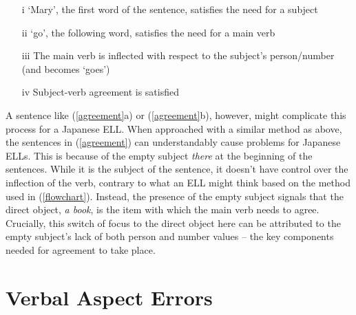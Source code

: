 \documentclass{article}
\begin{document}
\begin{exe}
    \label{flowchart}
    	\begin{itemize}
        	\item[i]{‘Mary', the first word of the sentence, satisfies the need for a subject}
            \item[ii]{‘go', the following word, satisfies the need for a main verb}
            \item[iii]{The main verb is inflected with respect to the subject's person/number (and becomes ‘goes')}
            \item[iv]{Subject-verb agreement is satisfied}
        \end{itemize}
\end{exe}
A sentence like (\ref{agreement}a) or (\ref{agreement}b), however, might complicate this process for a Japanese ELL. When approached with a similar method as above, the sentences in (\ref{agreement}) can understandably cause problems for Japanese ELLs. This is because of the empty subject \textit{there} at the beginning of the sentences. While it is the subject of the sentence, it doesn’t have control over the inflection of the verb, contrary to what an ELL might think based on the method used in (\ref{flowchart}). Instead, the presence of the empty subject signals that the direct object, \textit{a book}, is the item with which the main verb needs to agree. Crucially, this switch of focus to the direct object here can be attributed to the empty subject’s lack of both person and number values – the key components needed for agreement to take place.

\section{Verbal Aspect Errors}
\end{document}
